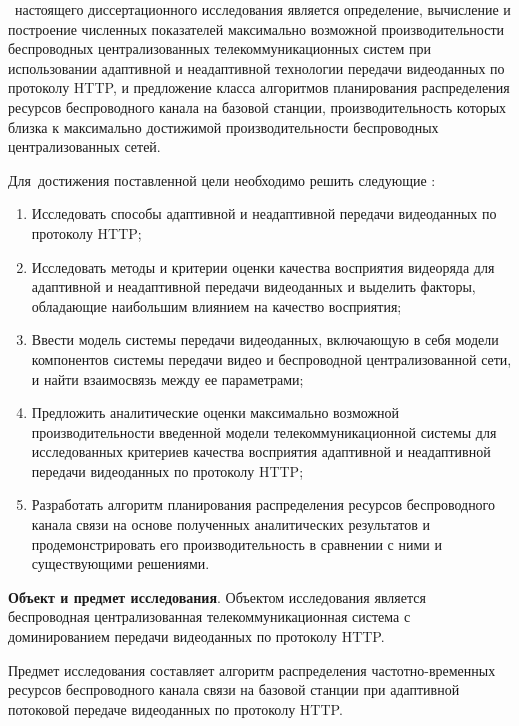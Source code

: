 \aim\ настоящего диссертационного исследования является определение, вычисление и построение численных показателей максимально возможной производительности беспроводных централизованных телекоммуникационных систем при использовании адаптивной и неадаптивной технологии передачи видеоданных по протоколу HTTP, и предложение класса алгоритмов планирования распределения ресурсов беспроводного канала на базовой станции, производительность которых близка к максимально достижимой производительности беспроводных централизованных сетей.

Для~достижения поставленной цели необходимо решить следующие {\tasks}:
\begin{enumerate}
    \item Исследовать способы адаптивной и неадаптивной передачи видеоданных по протоколу HTTP;
    \item Исследовать методы и критерии оценки качества восприятия видеоряда для адаптивной и неадаптивной передачи видеоданных и выделить факторы, обладающие наибольшим влиянием на качество восприятия;
    \item Ввести модель системы передачи видеоданных, включающую в себя модели компонентов системы передачи видео и беспроводной централизованной сети, и найти взаимосвязь между ее параметрами;
    \item Предложить аналитические оценки максимально возможной производительности введенной модели телекоммуникационной системы для исследованных критериев качества восприятия адаптивной и неадаптивной передачи видеоданных по протоколу HTTP;
    \item Разработать алгоритм планирования распределения ресурсов беспроводного канала связи на основе полученных аналитических результатов и продемонстрировать его производительность в сравнении с ними и существующими решениями.
\end{enumerate}

\textbf{Объект и предмет исследования}. Объектом исследования является беспроводная централизованная телекоммуникационная система с доминированием передачи видеоданных по протоколу HTTP.

Предмет исследования составляет алгоритм распределения частотно-временных ресурсов беспроводного канала связи на базовой станции при адаптивной потоковой передаче видеоданных по протоколу HTTP.

